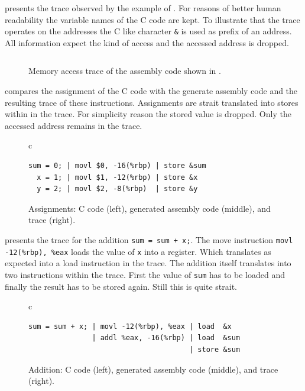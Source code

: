 \documentclass[onecolumn, openright, master, english, signatures]{dbrgrptt}
\begin{document}
 presents the \ac{trace} observed by the example of . For reasons of better human readability the variable names of the C code are kept. To illustrate that the \ac{trace} operates on the addresses the C like character \texttt{\&} is used as prefix of an address. All information expect the kind of access and the accessed address is dropped.

\begin{figure}[!ht]
  \centering
  \begin{tabular}{c}
  
  \end{tabular}
  \caption{Memory access trace of the assembly code shown in .}
  \label{fig:mat-example-trace}
\end{figure}

 compares the assignment of the C code with the generate assembly code and the resulting \ac{trace} of these instructions. Assignments are strait translated into stores within in the \ac{trace}. For simplicity reason the stored value is dropped. Only the accessed address remains in the \ac{trace}.

\begin{figure}[!ht]
  \centering
  \begin{tabular}{c}
  \begin{lstlisting}
sum = 0; | movl $0, -16(%rbp) | store &sum
  x = 1; | movl $1, -12(%rbp) | store &x
  y = 2; | movl $2, -8(%rbp)  | store &y
  \end{lstlisting}
  \end{tabular}
  \caption{Assignments: C code (left), generated assembly code (middle), and \ac{trace} (right).}
  \label{fig:mat-example-comp-assignment-all}
\end{figure}

 presents the \ac{trace} for the addition \texttt{sum = sum + x;}. The move instruction \texttt{movl -12(\%rbp), \%eax} loads the value of \texttt{x} into a register. Which translates as expected into a load instruction in the \ac{trace}. The addition itself translates into two instructions within the \ac{trace}. First the value of \texttt{sum} has to be loaded and finally the result has to be stored again. Still this is quite strait.

\begin{figure}[!ht]
  \centering
  \begin{tabular}{c}
  \begin{lstlisting}
sum = sum + x; | movl -12(%rbp), %eax | load  &x
               | addl %eax, -16(%rbp) | load  &sum
                                      | store &sum
  \end{lstlisting}
  \end{tabular}
  \caption{Addition: C code (left), generated assembly code (middle), and \ac{trace} (right).}
  \label{fig:mat-example-comp-addition-all}
\end{figure}
\end{document}
